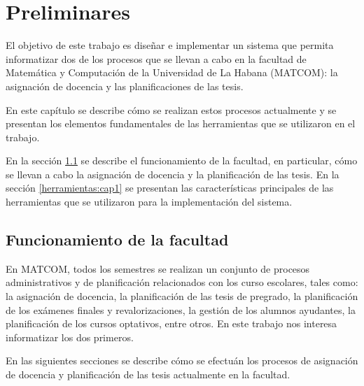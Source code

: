 \chapter{Preliminares}\label{chapter:preliminaries}
El objetivo de este trabajo es diseñar e implementar un sistema que 
permita informatizar dos de los procesos que se llevan a cabo en la facultad
de Matemática y Computación de la Universidad de La Habana (MATCOM): 
la asignación de docencia y las planificaciones de las tesis.

En este capítulo se describe cómo se realizan estos procesos actualmente 
y se presentan los elementos fundamentales de las herramientas que se utilizaron 
en el trabajo.

En la sección \ref{section:funcionamiento de la facultad} se describe 
el funcionamiento de la facultad, en particular, cómo se llevan a cabo la 
asignación de docencia y la planificación de las tesis. En la sección 
\ref{herramientas:cap1} se presentan las características principales de las 
herramientas que se utilizaron para la implementación del sistema.





\section{Funcionamiento de la facultad}\label{section:funcionamiento de la facultad}
En MATCOM, todos los semestres se realizan 
un conjunto de procesos administrativos y de planificación relacionados con
los curso escolares, tales como:
la asignación de docencia, la planificación de las tesis de pregrado,
la planificación de los exámenes finales y 
revalorizaciones, la gestión de los alumnos ayudantes, la planificación de los cursos 
optativos, entre otros. En este trabajo nos interesa informatizar los dos primeros.

En las siguientes secciones se describe cómo se efectuán
los procesos de asignación de docencia y planificación de las tesis
actualmente en la facultad.




